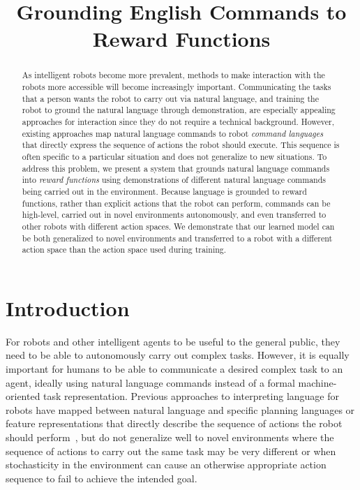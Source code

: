 \documentclass[conference]{IEEEtran}
\title{Grounding English Commands to Reward Functions}
\author{}
\begin{document}
\maketitle

\begin{abstract}
As intelligent robots become more prevalent, methods to make
interaction with the robots more accessible will become increasingly
important. Communicating the tasks that a person wants the robot to
carry out via natural language, and training the robot to ground the
natural language through demonstration, are especially appealing
approaches for interaction since they do not require a technical
background.  However, existing approaches map natural language commands
to robot {\em command languages} that directly express the sequence of
actions the robot should execute.  This sequence is often specific to
a particular situation and does not generalize to new situations.  To
address this problem, we present a system that grounds natural
language commands into {\em reward functions} using demonstrations of
different natural language commands being carried out in the
environment.  Because language is grounded to reward functions, rather
than explicit actions that the robot can perform, commands can be
high-level, carried out in novel environments autonomously, and even
transferred to other robots with different action spaces. We
demonstrate that our learned model can be both generalized to novel
environments and transferred to a robot with a different action
space than the action space used during training.
\end{abstract}

\IEEEpeerreviewmaketitle

\section{Introduction}
For robots and other intelligent agents to be useful to the general
public, they need to be able to autonomously carry out complex
tasks. However, it is equally important for humans to be able to
communicate a desired complex task to an agent, ideally using natural
language commands instead of a formal machine-oriented task
representation.  Previous approaches to interpreting language for
robots have mapped between natural language and specific planning
languages or feature representations that directly describe the
sequence of actions the robot should perform~\citep{kollar10,
  tellex11, matuszek12, matuszek12a, chen11}, but do not generalize well to
novel environments where the sequence of actions to carry out the same
task may be very different or when stochasticity in the environment
can cause an otherwise appropriate action sequence to fail to achieve
the intended goal.
\end{document}
